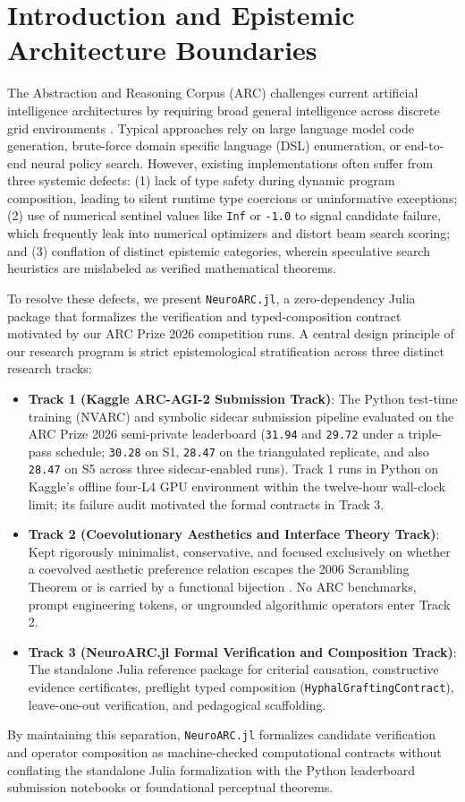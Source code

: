 \section{Introduction and Epistemic Architecture Boundaries}

The Abstraction and Reasoning Corpus (ARC) challenges current artificial intelligence architectures by requiring broad general intelligence across discrete grid environments \cite{chollet2019measure}. Typical approaches rely on large language model code generation, brute-force domain specific language (DSL) enumeration, or end-to-end neural policy search. However, existing implementations often suffer from three systemic defects: (1) lack of type safety during dynamic program composition, leading to silent runtime type coercions or uninformative exceptions; (2) use of numerical sentinel values like \texttt{Inf} or \texttt{-1.0} to signal candidate failure, which frequently leak into numerical optimizers and distort beam search scoring; and (3) conflation of distinct epistemic categories, wherein speculative search heuristics are mislabeled as verified mathematical theorems.

To resolve these defects, we present \texttt{NeuroARC.jl}, a zero-dependency Julia package that formalizes the verification and typed-composition contract motivated by our ARC Prize 2026 competition runs. A central design principle of our research program is strict epistemological stratification across three distinct research tracks:
\begin{itemize}
  \item \textbf{Track 1 (Kaggle ARC-AGI-2 Submission Track)}: The Python test-time training (NVARC) and symbolic sidecar submission pipeline evaluated on the ARC Prize 2026 semi-private leaderboard (\texttt{31.94} and \texttt{29.72} under a triple-pass schedule; \texttt{30.28} on S1, \texttt{28.47} on the triangulated replicate, and also \texttt{28.47} on S5 across three sidecar-enabled runs). Track 1 runs in Python on Kaggle's offline four-L4 GPU environment within the twelve-hour wall-clock limit; its failure audit motivated the formal contracts in Track 3.
  \item \textbf{Track 2 (Coevolutionary Aesthetics and Interface Theory Track)}: Kept rigorously minimalist, conservative, and focused exclusively on whether a coevolved aesthetic preference relation \cite{prum2013coevolutionary} escapes the 2006 Scrambling Theorem or is carried by a functional bijection \cite{hoffman2006scrambling,hoffman2015interface}. No ARC benchmarks, prompt engineering tokens, or ungrounded algorithmic operators enter Track 2.
  \item \textbf{Track 3 (NeuroARC.jl Formal Verification and Composition Track)}: The standalone Julia reference package for criterial causation, constructive evidence certificates, preflight typed composition (\texttt{HyphalGraftingContract}), leave-one-out verification, and pedagogical scaffolding.
\end{itemize}

By maintaining this separation, \texttt{NeuroARC.jl} formalizes candidate verification and operator composition as machine-checked computational contracts without conflating the standalone Julia formalization with the Python leaderboard submission notebooks or foundational perceptual theorems.
